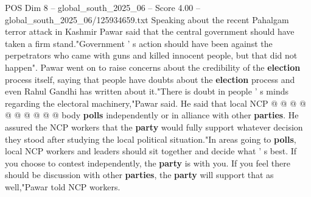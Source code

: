 \begin{textsample}{POS Dim 8 – global\_south\_2025\_06 – Score 4.00 – global\_south\_2025\_06/125934659.txt}
Speaking about the recent Pahalgam terror attack in Kashmir Pawar said that the central government should have taken a firm stand."Government ' s action should have been against the perpetrators who came with guns and killed innocent people, but that did not happen".
Pawar went on to raise concerns about the credibility of the \textbf{election} process itself, saying that people have doubts about the \textbf{election} process and even Rahul Gandhi has written about it."There is doubt in people ' s minds regarding the electoral machinery,"Pawar said.
He said that local NCP @ @ @ @ @ @ @ @ @ @ body \textbf{polls} independently or in alliance with other \textbf{parties}.
He assured the NCP workers that the \textbf{party} would fully support whatever decision they stood after studying the local political situation."In areas going to \textbf{polls}, local NCP workers and leaders should sit together and decide what ' s best.
If you choose to contest independently, the \textbf{party} is with you.
If you feel there should be discussion with other \textbf{parties}, the \textbf{party} will support that as well,"Pawar told NCP workers.

\end{textsample}
